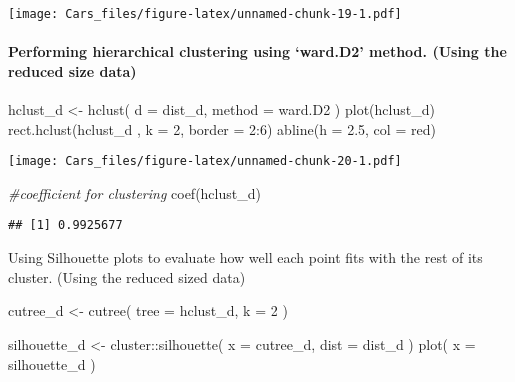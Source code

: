 \documentclass[
]{article}
\newenvironment{Shaded}{\begin{snugshade}}{\end{snugshade}}
\newcommand{\AttributeTok}[1]{\textcolor[rgb]{0.77,0.63,0.00}{#1}}
\newcommand{\CommentTok}[1]{\textcolor[rgb]{0.56,0.35,0.01}{\textit{#1}}}
\newcommand{\DecValTok}[1]{\textcolor[rgb]{0.00,0.00,0.81}{#1}}
\newcommand{\FloatTok}[1]{\textcolor[rgb]{0.00,0.00,0.81}{#1}}
\newcommand{\FunctionTok}[1]{\textcolor[rgb]{0.00,0.00,0.00}{#1}}
\newcommand{\NormalTok}[1]{#1}
\newcommand{\OtherTok}[1]{\textcolor[rgb]{0.56,0.35,0.01}{#1}}
\newcommand{\SpecialCharTok}[1]{\textcolor[rgb]{0.00,0.00,0.00}{#1}}
\newcommand{\StringTok}[1]{\textcolor[rgb]{0.31,0.60,0.02}{#1}}
\begin{document}
\texttt{[image: Cars\_files/figure-latex/unnamed-chunk-19-1.pdf]}

\hypertarget{performing-hierarchical-clustering-using-ward.d2-method.-using-the-reduced-size-data}{%
\paragraph{Performing hierarchical clustering using `ward.D2' method.
(Using the reduced size
data)}\label{performing-hierarchical-clustering-using-ward.d2-method.-using-the-reduced-size-data}}

\begin{Shaded}
\begin{Highlighting}[]
\NormalTok{hclust\_d }\OtherTok{\textless{}{-}} \FunctionTok{hclust}\NormalTok{(}
  \AttributeTok{d =}\NormalTok{ dist\_d,}
  \AttributeTok{method =} \StringTok{\textquotesingle{}ward.D2\textquotesingle{}}
\NormalTok{)}
\FunctionTok{plot}\NormalTok{(hclust\_d)}
\FunctionTok{rect.hclust}\NormalTok{(hclust\_d , }\AttributeTok{k =} \DecValTok{2}\NormalTok{, }\AttributeTok{border =} \DecValTok{2}\SpecialCharTok{:}\DecValTok{6}\NormalTok{)}
\FunctionTok{abline}\NormalTok{(}\AttributeTok{h =} \FloatTok{2.5}\NormalTok{, }\AttributeTok{col =} \StringTok{\textquotesingle{}red\textquotesingle{}}\NormalTok{)}
\end{Highlighting}
\end{Shaded}

\texttt{[image: Cars\_files/figure-latex/unnamed-chunk-20-1.pdf]}

\begin{Shaded}
\begin{Highlighting}[]
\CommentTok{\#coefficient for clustering}
\FunctionTok{coef}\NormalTok{(hclust\_d)}
\end{Highlighting}
\end{Shaded}

\begin{verbatim}
## [1] 0.9925677
\end{verbatim}

Using Silhouette plots to evaluate how well each point fits with the
rest of its cluster. (Using the reduced sized data)

\begin{Shaded}
\begin{Highlighting}[]
\NormalTok{cutree\_d }\OtherTok{\textless{}{-}} \FunctionTok{cutree}\NormalTok{(}
  \AttributeTok{tree =}\NormalTok{ hclust\_d,}
  \AttributeTok{k =} \DecValTok{2}
\NormalTok{)}

\NormalTok{silhouette\_d }\OtherTok{\textless{}{-}}\NormalTok{ cluster}\SpecialCharTok{::}\FunctionTok{silhouette}\NormalTok{(}
  \AttributeTok{x =}\NormalTok{ cutree\_d,}
  \AttributeTok{dist =}\NormalTok{ dist\_d}
\NormalTok{)}
\FunctionTok{plot}\NormalTok{(}
  \AttributeTok{x =}\NormalTok{ silhouette\_d}
\NormalTok{)}
\end{Highlighting}
\end{Shaded}
\end{document}
